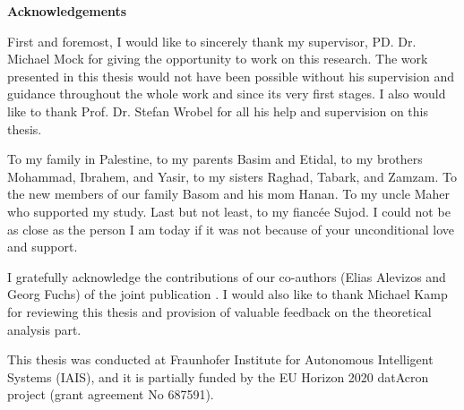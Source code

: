 

	\thispagestyle{empty}
{\noindent%
	\huge{\textbf{\textsf{Acknowledgements}}}
}
\vspace{2cm}
\begin{flushleft}
	\noindent%

\justify
\par First and foremost, I would like to sincerely thank my supervisor, PD. Dr. Michael Mock for giving the opportunity to work on this research. The work presented in this thesis would not have been possible without his supervision and guidance throughout the whole work and since its very first stages. I also would like to thank Prof. Dr. Stefan Wrobel for all his help and supervision on this thesis. 

\justify
\par To my family in Palestine, to my parents Basim and Etidal, to my brothers Mohammad, Ibrahem, and Yasir, to my sisters Raghad, Tabark, and Zamzam. To the new members of our family Basom and his mom Hanan. To my uncle Maher who supported my study. Last but not least, to my fiancée Sujod. I could not be as close as the person I am today if it was not because of your unconditional love and support. 

\justify
\par I gratefully acknowledge the contributions of our co-authors (Elias Alevizos and Georg Fuchs) of the joint publication \cite{Qadah}. I would also like to thank  Michael Kamp for reviewing this thesis and provision of valuable feedback on the theoretical analysis part.
\justify
\par This thesis was conducted at Fraunhofer Institute for Autonomous Intelligent Systems (IAIS), and it is partially funded by the EU Horizon 2020 datAcron project (grant agreement No 687591).

	
	
\end{flushleft}
